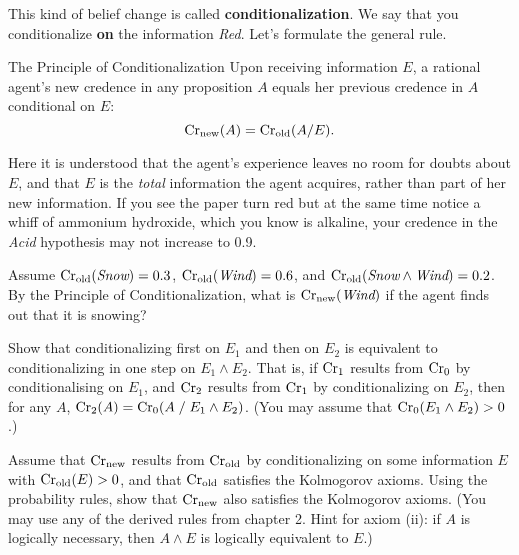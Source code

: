 This kind of belief change is called \textbf{conditionalization}. We say that
you conditionalize \textbf{on} the information \emph{Red}. Let's formulate the
general rule.

\begin{genericthm}{The Principle of Conditionalization}
  Upon receiving information $E$, a rational agent's new credence
  in any proposition $A$ equals her previous credence in $A$
  conditional on $E$: 
  \[
    \text{Cr}_\text{new}(A) = \text{Cr}_\text{old}(A/E).
  \]
\end{genericthm}

Here it is understood that the agent's experience leaves no room for doubts
about $E$, and that $E$ is the \emph{total} information the agent acquires,
rather than part of her new information. If you see the paper turn red but at
the same time notice a whiff of ammonium hydroxide, which you know is alkaline,
your credence in the \emph{Acid} hypothesis may not increase to 0.9.

\begin{exercise}{1}
  Assume $\text{Cr$_{\text{old}}$}(\emph{Snow}) = 0.3$, $\text{Cr$_{\text{old}}$}(\emph{Wind}) = 0.6$, and
  $\text{Cr$_{\text{old}}$}(\emph{Snow} \land \emph{Wind}) = 0.2$. By the Principle of
  Conditionalization, what is $\text{Cr$_{\text{new}}$}(\emph{Wind})$ if the agent finds
  out that it is snowing? 
\end{exercise}


\begin{exercise}{2}
  Show that conditionalizing first on $E_{1}$ and then on $E_{2}$ is equivalent
  to conditionalizing in one step on $E_{1} \land E_{2}$. That is, if $\text{Cr}_{1}$
  results from $\text{Cr}_{0}$ by conditionalising on $E_{1}$, and $\text{Cr}_{2}$ results
  from $\text{Cr}_{1}$ by conditionalizing on $E_{2}$, then for any $A$,
  $\text{Cr}_{2}(A) = \text{Cr}_{0}(A \;/\; E_{1} \land E_{2})$. (You may assume that
  $\text{Cr}_{0}(E_{1} \land E_{2}) > 0$.)
\end{exercise}

\begin{exercise}{3}
  Assume that $\text{Cr$_{\text{new}}$}$ results from $\text{Cr$_{\text{old}}$}$ by conditionalizing on some
  information $E$ with $\text{Cr$_{\text{old}}$}(E) > 0$, and that $\text{Cr$_{\text{old}}$}$ satisfies the
  Kolmogorov axioms. Using the probability rules, show that $\text{Cr$_{\text{new}}$}$
  also satisfies the Kolmogorov axioms. (You may use any of the
  derived rules from chapter 2. Hint for axiom (ii): if
  $A$ is logically necessary, then $A\land E$ is logically equivalent
  to $E$.)
\end{exercise}


